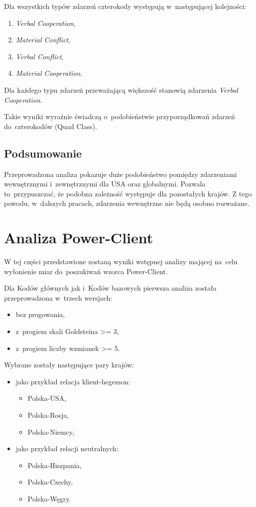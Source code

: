 \documentclass[11pt]{report}
\begin{document}
    Dla wszystkich typów zdarzeń czterokody występują w~następującej kolejności:
    \begin{enumerate}
        \item \textit{Verbal Cooperation},
        \item \textit{Material Conflict},
        \item \textit{Verbal Conflict},
        \item \textit{Material Cooperation}.
    \end{enumerate}
    Dla każdego typu zdarzeń przeważającą większość stanowią zdarzenia \textit{Verbal Cooperation}.

    Takie wyniki wyraźnie świadczą o~podobieństwie przyporządkowań zdarzeń do~czterokodów (Quad Class).

    \subsection{Podsumowanie}
    Przeprowadzona analiza pokazuje duże podobieństwo pomiędzy zdarzeniami wewnętrznymi i~zewnętrznymi dla USA oraz globalnymi.
    Pozwala to~przypuszczać, że podobna zależność występuje dla pozostałych krajów.
    Z tego powodu, w~dalszych pracach, zdarzenia wewnętrzne nie będą osobno rozważane.


    \section{Analiza Power-Client}\label{sec:analiza-power-client}
    W tej części przedstawione zostaną wyniki wstępnej analizy mającej na~celu wyłonienie miar
    do~poszukiwań wzorca Power-Client.

    Dla Kodów głównych jak i~Kodów bazowych pierwsza analiza została przeprowadzona w~trzech wersjach:
    \begin{itemize}
        \item bez progowania,
        \item z~progiem skali Goldsteina >= 3,
        \item z~progiem liczby wzmianek >= 5.
    \end{itemize}
    Wybrane zostały następujące pary krajów:
    \begin{itemize}
        \item jako przykład relacja klient-hegemon:
        \begin{itemize}
            \item Polska-USA,
            \item Polska-Rosja,
            \item Polska-Niemcy,
        \end{itemize}
        \item jako przykład relacji neutralnych:
        \begin{itemize}
            \item Polska-Hiszpania,
            \item Polska-Czechy,
            \item Polska-Węgry.
        \end{itemize}
    \end{itemize}
\end{document}
